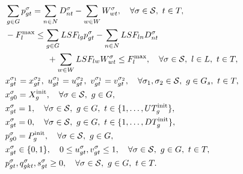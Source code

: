 \begin{subequations}
\begin{align}
	& \sum_{g\in G} p_{gt}^\sigma = \sum_{n\in N} D_{nt}^\sigma - \sum_{w\in W} W_{wt}^\sigma, \quad \forall \sigma \in \mathcal{S},\ t\in T,\ \label{eq:suc:cons12} \\
	& -F^\text{max}_l \leq \sum_{g\in G} LSF_{lg} p_{gt}^\sigma - \sum_{n\in N} LSF_{ln} D_{nt}^\sigma \notag \\
	&\quad\quad\quad\quad\quad + \sum_{w\in W} LSF_{lw} W_{wt}^\sigma \leq F^\text{max}_l,\quad \forall \sigma \in \mathcal{S},\ l\in L,\ t\in T, \label{eq:suc:cons13} \\
	& x_{gt}^{\sigma_1} = x_{gt}^{\sigma_2},\ u_{gt}^{\sigma_1} = u_{gt}^{\sigma_2},\ v_{gt}^{\sigma_1} = v_{gt}^{\sigma_2},\quad \forall \sigma_1,\sigma_2 \in \mathcal{S},\ g\in G_s,\ t\in T, \label{eq:suc:cons14} \\
	& x_{g0}^\sigma = X^\text{init}_g, \quad \forall \sigma \in \mathcal{S},\ g\in G, \label{eq:suc:cons15} \\
	& x_{gt}^\sigma = 1, \quad \forall \sigma \in \mathcal{S},\ g\in G,\ t\in \{1, \dots, UT^\text{init}_g\}, \label{eq:suc:cons16} \\
	& x_{gt}^\sigma = 0, \quad \forall \sigma \in \mathcal{S},\ g\in G,\ t\in \{1, \dots, DT^\text{init}_g\}, \label{eq:suc:cons17} \\
	& p_{g0}^\sigma = P^\text{init}_g, \quad \forall \sigma \in \mathcal{S},\ g\in G,\ \label{eq:suc:cons18} \\
	& x_{gt}^\sigma \in \{0,1\},\quad 0\leq u_{gt}^\sigma , v_{gt}^\sigma  \leq 1, \quad \forall \sigma \in \mathcal{S},\ g\in G,\ t\in T, \label{eq:suc:cons19} \\
	& p_{gt}^\sigma,q_{gkt}^\sigma,s_{gt}^\sigma \geq 0, \quad \forall \sigma \in \mathcal{S},\ g\in G,\ t\in T. \label{eq:suc:cons20} 
	\end{align}
\end{subequations}

